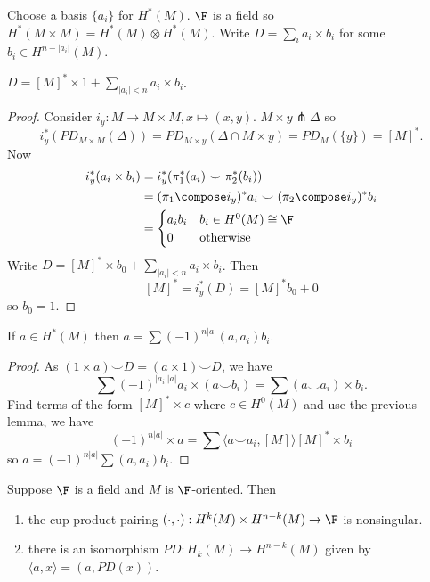 \documentclass[a4paper]{article}
\newcommand*{\cp}{\smile} %
\begin{document}
Choose a basis \(\{a_i\}\) for \(H^*(M)\). \(\F\) is a field so \(H^*(M \times M) = H^*(M) \otimes H^*(M)\). Write \(D = \sum_i a_i \times b_i\) for some \(b_i \in H^{n - |a_i|}(M)\).

\begin{lemma}
  \(D = [M]^* \times 1 + \sum_{|a_i| < n} a_i \times b_i\).
\end{lemma}

\begin{proof}
  Consider \(i_y: M \to M \times M, x \mapsto (x, y)\). \(M \times y \pitchfork \Delta\) so
  \[
    i_y^*(PD_{M \times M}(\Delta)) = PD_{M \times y}(\Delta \cap M \times y) = PD_M(\{y\}) = [M]^*.
  \]
  Now
  \begin{align*}
    i_y^*(a_i \times b_i) &= i_y^*(\pi_1^*(a_i) \cp \pi_2^*(b_i)) \\
                          &= (\pi_1 \compose i_y)^* a_i \cp (\pi_2 \compose i_y)^*b_i \\
                          &=
                            \begin{cases}
                              a_i b_i & b_i \in H^0(M) \cong \F \\
                              0 & \text{otherwise}
                            \end{cases}
  \end{align*}
  Write \(D = [M]^* \times b_0 + \sum_{|a_i| < n} a_i \times b_i\). Then
  \[
    [M]^* = i_y^*(D) = [M]^* b_0 + 0
  \]
  so \(b_0 = 1\).
\end{proof}

\begin{lemma}
  \label{lem:decomposition by cup product pairing}
  If \(a \in H^*(M)\) then \(a = \sum (-1)^{n |a|}(a, a_i) b_i\).
\end{lemma}

\begin{proof}
  As \((1 \times a) \cp D = (a \times 1) \cp D\), we have
  \[
    \sum (-1)^{|a_i||a|} a_i \times (a \cp b_i) = \sum (a \cp a_i) \times b_i.
  \]
  Find terms of the form \([M]^* \times c\) where \(c \in H^0(M)\) and use the previous lemma, we have
  \[
    (-1)^{n|a|} \times a = \sum \langle a \cp a_i, [M] \rangle [M]^* \times b_i
  \]
  so \(a = (-1)^{n|a|} \sum (a, a_i) b_i\).
\end{proof}

\begin{corollary}
  Suppose \(\F\) is a field and \(M\) is \(\F\)-oriented. Then
  \begin{enumerate}
  \item the cup product pairing \((\cdot, \cdot): H^k(M) \times H^{n - k}(M) \to \F\) is nonsingular.
  \item there is an isomorphism \(PD: H_k(M) \to H^{n - k}(M)\) given by \(\langle a, x \rangle = (a, PD(x))\).
  \end{enumerate}
\end{corollary}
\end{document}
